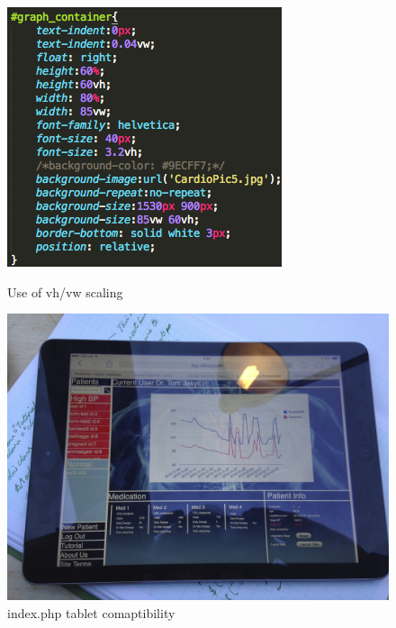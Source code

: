 \documentclass[11pt]{article}
\begin{document}
\begin{figure}
\centering
\includegraphics[scale=0.4]{CSSscaling.png}
\caption{Use of vh/vw scaling \label{CSSscaling}} 
\includegraphics[scale=0.04]{ipad.png}
\caption{index.php tablet comaptibility \label{ipad}} 
\end{figure} 
\end{document}
